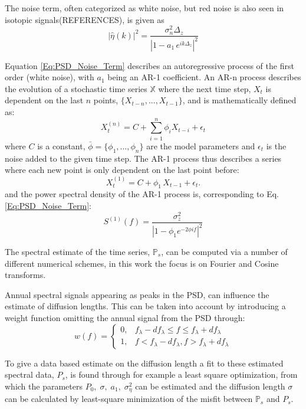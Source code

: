 \documentclass[../../CompleteThesis2/Complete_2ndDraft]{subfiles}
\begin{document}
The noise term, often categorized as white noise, but red noise is also seen in isotopic signals(REFERENCES), is given as
\begin{equation}
	|\hat{\eta}(k)|^2 = \frac{\sigma_n^2 \Delta_z}{|1 - a_1 \, e^{ik\Delta_z}|^2}
	\label{Eq:PSD_Noise_Term}
\end{equation}

Equation \ref{Eq:PSD_Noise_Term} describes an autoregressive process of the first order (white noise), with $a_1$ being an AR-1 coefficient. An AR-n process describes the evolution of a stochastic time series $\mathbb{X}$ where the next time step, $X_t$ is dependent on the last $n$ points, $\{X_{t-n},...,X_{t-1}\}$, and is mathematically defined as:
\begin{equation}
	X_t^{(n)} = C + \sum_{i=1}^{n}\phi_i X_{t-i} + \epsilon_t
	\label{Eq:AR-n}
\end{equation}
where $C$ is a constant, $\bar{\phi} = \{\phi_1,...,\phi_{n}\}$ are the model parameters and $\epsilon_t$ is the noise added to the given time step. The AR-1 process thus describes a series where each new point is only dependent on the last point before:
\begin{equation}
	X_t^{(1)} = C + \phi_{1}\, X_{t-1} + \epsilon_t.
	\label{Eq:AR-1}
\end{equation} 
and the power spectral density of the AR-1 process is, corresponding to Eq. \ref{Eq:PSD_Noise_Term}:
\begin{equation}
	S^{(1)}(f) = \frac{\sigma_z^2}{|1 - \phi_{1}e^{-2\phi i f}|^2}
\end{equation}

The spectral estimate of the time series, $\mathbb{P}_s$, can be computed via a number of different numerical schemes, in this work the focus is on Fourier and Cosine transforms. 


Annual spectral signals appearing as peaks in the PSD, can influence the  estimate of diffusion lengths. This can be taken into account by introducing a weight function omitting the annual signal from the PSD through:
\begin{equation}
	w(f) = \begin{cases}
		0, & f_{\lambda} - d f_{\lambda} \leq f \leq f_{\lambda} + d f_{\lambda} \\
		1, & f < f_{\lambda} - d f_{\lambda}, f > f_{\lambda} + d f_{\lambda}
	\end{cases}
\end{equation}

To give a data based estimate on the diffusion length a fit to these estimated spectral data, $P_s$, is found through for example a least square optimization, from which the parameters $P_0, \; \sigma, \; a_1, \; \sigma_{\eta}^2$ can be estimated and the diffusion length $\sigma$ can be calculated by least-square minimization of the misfit between $\mathbb{P}_s$ and $P_s$.
\end{document}
